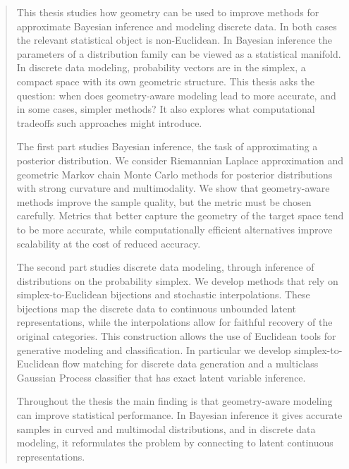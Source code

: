 \begin{abstract}
  
This thesis studies how geometry can be used to improve methods for approximate Bayesian inference and modeling discrete data. 
% 
In both cases the relevant statistical object is non-Euclidean. In Bayesian inference the parameters of a distribution family can be viewed as a statistical manifold. In discrete data modeling, probability vectors are in the simplex, a compact space with its own geometric structure. This thesis asks the question: when does geometry-aware modeling lead to more accurate, and in some cases, simpler methods?   
% 
It also explores what computational tradeoffs such approaches might introduce. 


The first part studies Bayesian inference, the task of approximating a posterior distribution. We consider Riemannian Laplace approximation and geometric Markov chain Monte Carlo methods for posterior distributions with strong curvature and multimodality. We show that geometry-aware methods improve the sample quality, but the metric must be chosen carefully. Metrics that better capture the geometry of the target space tend to be more accurate, while computationally efficient alternatives improve scalability at the cost of reduced accuracy. 

The second part studies discrete data modeling, through inference of distributions on the probability simplex. We develop methods that rely on simplex-to-Euclidean bijections and stochastic interpolations. These bijections map the discrete data to continuous unbounded latent representations, while the interpolations allow for faithful recovery of the original categories. This construction allows the use of Euclidean tools for generative modeling and classification. In particular we develop simplex-to-Euclidean flow matching for discrete data generation and a multiclass Gaussian Process classifier that has exact latent variable inference. 

Throughout the thesis the main finding is that geometry-aware modeling can improve statistical performance. In Bayesian inference it gives accurate samples in curved and multimodal distributions, and in discrete data modeling, it reformulates the problem by connecting to latent continuous representations.   

\end{abstract}
